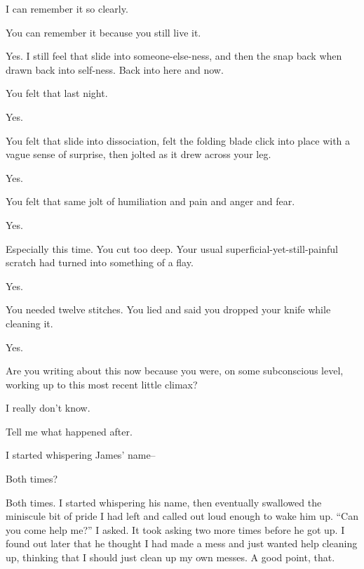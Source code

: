 \begin{paracol}{2}
\begin{leftcolumn}
I can remember it so clearly.

\begin{ally}
You can remember it because you still live it.
\end{ally}
Yes. I still feel that slide into someone-else-ness, and then the snap back when drawn back into self-ness. Back into here and now.

\begin{ally}
You felt that last night.
\end{ally}
Yes.

\begin{ally}
You felt that slide into dissociation, felt the folding blade click into place with a vague sense of surprise, then jolted as it drew across your leg.
\end{ally}
Yes.

\begin{ally}
You felt that same jolt of humiliation and pain and anger and fear.
\end{ally}
Yes.

\begin{ally}
Especially this time. You cut too deep. Your usual superficial-yet-still-painful scratch had turned into something of a flay.
\end{ally}
Yes.

\begin{ally}
You needed twelve stitches. You lied and said you dropped your knife while cleaning it.
\end{ally}
Yes.

\begin{ally}
Are you writing about this now because you were, on some subconscious level, working up to this most recent little climax?
\end{ally}
I really don't know.

\begin{ally}
Tell me what happened after.
\end{ally}
I started whispering James' name--

\begin{ally}
Both times?
\end{ally}
Both times. I started whispering his name, then eventually swallowed the miniscule bit of pride I had left and called out loud enough to wake him up. ``Can you come help me?'' I asked. It took asking two more times before he got up. I found out later that he thought I had made a mess and just wanted help cleaning up, thinking that I should just clean up my own messes. A good point, that.


\end{leftcolumn}
\end{paracol}
